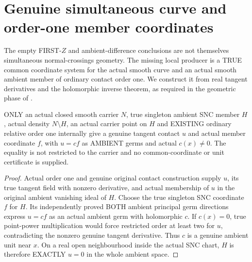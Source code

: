 \section{Genuine simultaneous curve and order-one member coordinates}

The empty FIRST-$Z$ and ambient-difference conclusions are not themselves
simultaneous normal-crossings geometry. The missing local producer is a
TRUE common coordinate system for the actual smooth curve and an actual
smooth ambient member of ordinary contact order one. We construct it
from real tangent derivatives and the holomorphic inverse theorem,
as required in the geometric phase of
\cite[\S12]{bierstone-milman97-invent-math}.

\begin{lemma}
\label{hir:sharp-actual-order-one-curve-member-ambient-unit-contact}
\leanok
ONLY an actual closed smooth carrier $N$, true singleton ambient SNC
member $H$, actual density $N\setminus H$, an actual carrier point on
$H$ and EXISTING ordinary relative order one internally give a genuine
tangent contact $u$ and actual member coordinate $f$, with
$u=c f$ as AMBIENT germs and actual $c(x)\ne0$. The equality is not
restricted to the carrier and no common-coordinate or unit certificate
is supplied.
\end{lemma}
\begin{proof}
Actual order one and genuine original contact construction supply $u$,
its true tangent field with nonzero derivative, and actual membership
of $u$ in the original ambient vanishing ideal of $H$. Choose the true
singleton SNC coordinate $f$ for $H$. Its independently proved BOTH
ambient principal germ directions express $u=c f$ as an actual ambient
germ with holomorphic $c$. If $c(x)=0$, true point-power multiplication
would force restricted order at least two for $u$, contradicting the
nonzero genuine tangent derivative. Thus $c$ is a genuine ambient unit
near $x$. On a real open neighbourhood inside the actual SNC chart,
$H$ is therefore EXACTLY $u=0$ in the whole ambient space.
\end{proof}

